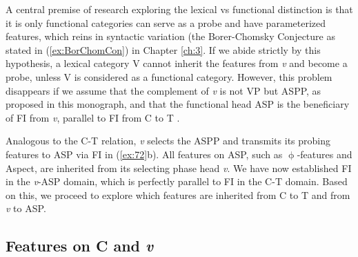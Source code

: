 \largerpage
A central premise of research exploring the lexical vs functional distinction is that it is only functional categories can serve as a probe and have parameterized features, which reins in syntactic variation (the Borer-Chomsky Conjecture as stated in (\ref{ex:BorChomCon}) in Chapter \ref{ch:3}. If we abide strictly by this hypothesis, a lexical category V cannot inherit the features from \textit{v} and become a probe, unless V is considered as a functional category. However, this problem disappears if we assume that the complement of \textit{v} is not \ac{VP} but \ac{ASP}P, as proposed in this monograph, and that the functional head \ac{ASP} is the beneficiary of \ac{FI} from \textit{v}, parallel to \ac{FI} from C to T .

\ea\label{ex:72}
\z

Analogous to the C-T relation, \textit{v} selects the \ac{ASP}P and transmits its probing features to \ac{ASP} via \ac{FI} in (\ref{ex:72}b). All features on \ac{ASP}, such as $\upphi$-features and Aspect, are inherited from its selecting phase head \textit{v}. We have now established \ac{FI} in the \textit{v}-\ac{ASP} domain, which is perfectly parallel to \ac{FI} in the C-T domain. Based on this, we proceed to explore which features are inherited from C to T and from \textit{v} to \ac{ASP}. 

\subsection{Features on C and \textit{v}}\label{ch4:sect:4.1.1} 

